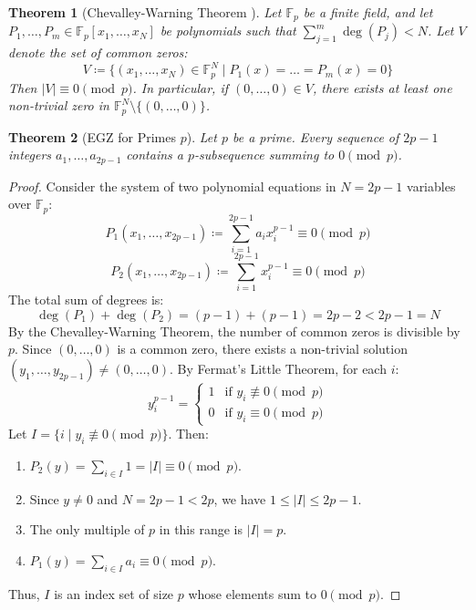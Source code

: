 \documentclass[11pt,a4paper]{article}
\newtheorem{theorem}{Theorem}[section]
\theoremstyle{definition}
\begin{document}
\begin{theorem}[Chevalley-Warning Theorem \cite{chevalley1935, warning1935}]\label{thm:chevalley_warning}
Let $\mathbb{F}_p$ be a finite field, and let $P_1, \dots, P_m \in \mathbb{F}_p[x_1, \dots, x_N]$ be polynomials such that $\sum_{j=1}^m \deg(P_j) < N$.
Let $V$ denote the set of common zeros:
\[ V \coloneqq \{ (x_1, \dots, x_N) \in \mathbb{F}_p^N \mid P_1(x) = \dots = P_m(x) = 0 \} \]
Then $|V| \equiv 0 \pmod p$. In particular, if $(0, \dots, 0) \in V$, there exists at least one non-trivial zero in $\mathbb{F}_p^N \setminus \{(0, \dots, 0)\}$.
\end{theorem}

\begin{theorem}[EGZ for Primes $p$]\label{thm:egz_prime}
Let $p$ be a prime. Every sequence of $2p - 1$ integers $a_1, \dots, a_{2p - 1}$ contains a $p$-subsequence summing to $0 \pmod p$.
\end{theorem}

\begin{proof}
Consider the system of two polynomial equations in $N = 2p - 1$ variables over $\mathbb{F}_p$:
\[ P_1(x_1, \dots, x_{2p - 1}) \coloneqq \sum_{i=1}^{2p - 1} a_i x_i^{p - 1} \equiv 0 \pmod p \]
\[ P_2(x_1, \dots, x_{2p - 1}) \coloneqq \sum_{i=1}^{2p - 1} x_i^{p - 1} \equiv 0 \pmod p \]
The total sum of degrees is:
\[ \deg(P_1) + \deg(P_2) = (p - 1) + (p - 1) = 2p - 2 < 2p - 1 = N \]
By the Chevalley-Warning Theorem, the number of common zeros is divisible by $p$.
Since $(0, \dots, 0)$ is a common zero, there exists a non-trivial solution $(y_1, \dots, y_{2p - 1}) \ne (0, \dots, 0)$.
By Fermat's Little Theorem, for each $i$:
\[ y_i^{p - 1} = \begin{cases} 1 & \text{if } y_i \not\equiv 0 \pmod p \\ 0 & \text{if } y_i \equiv 0 \pmod p \end{cases} \]
Let $I = \{ i \mid y_i \not\equiv 0 \pmod p \}$.
Then:
\begin{enumerate}
    \item $P_2(y) = \sum_{i \in I} 1 = |I| \equiv 0 \pmod p$.
    \item Since $y \ne 0$ and $N = 2p - 1 < 2p$, we have $1 \le |I| \le 2p - 1$.
    \item The only multiple of $p$ in this range is $|I| = p$.
    \item $P_1(y) = \sum_{i \in I} a_i \equiv 0 \pmod p$.
\end{enumerate}
Thus, $I$ is an index set of size $p$ whose elements sum to $0 \pmod p$.
\end{proof}
\end{document}
